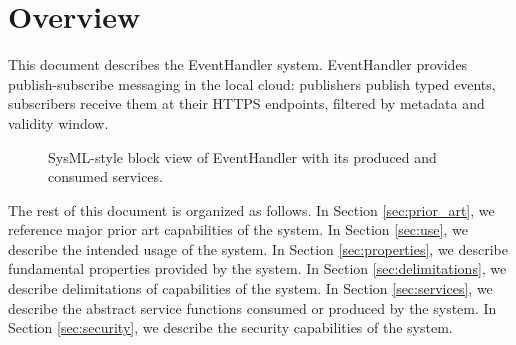 \documentclass[a4paper]{arrowhead}
\begin{document}
\section{Overview}
\label{sec:overview}

This document describes the EventHandler system. EventHandler provides publish-subscribe messaging in the local cloud: publishers publish typed events, subscribers receive them at their HTTPS endpoints, filtered by metadata and validity window.

\begin{figure}[ht!]
  \centering
  \caption{SysML-style block view of EventHandler with its produced and consumed services.}
  \label{fig:system}
\end{figure}

The rest of this document is organized as follows.
In Section \ref{sec:prior_art}, we reference major prior art capabilities of the system.
In Section \ref{sec:use}, we describe the intended usage of the system.
In Section \ref{sec:properties}, we describe fundamental properties provided by the system.
In Section \ref{sec:delimitations}, we describe delimitations of capabilities of the system.
In Section \ref{sec:services}, we describe the abstract service functions consumed or produced by the system.
In Section \ref{sec:security}, we describe the security capabilities of the system.
\end{document}
